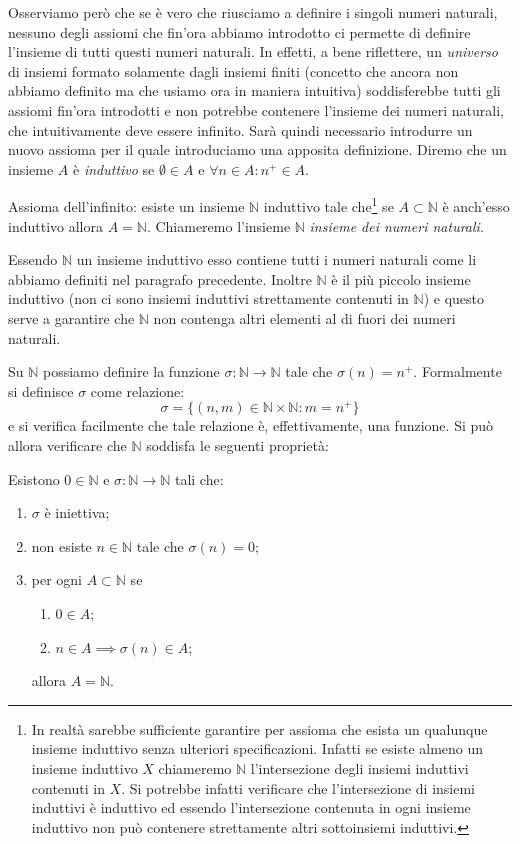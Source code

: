 \documentclass[italian,a4paper,hidelinks,headinclude]{scrartcl}
\newcommand{\NN}{{\mathbb N}}
\newcommand{\myemph}[1]{\emph{#1}\marginpar{#1}}
\begin{document}
Osserviamo però che se è vero che riusciamo a definire i singoli numeri naturali,
nessuno degli assiomi che fin'ora abbiamo introdotto ci permette di definire
l'insieme di tutti questi numeri naturali.
In effetti, a bene riflettere, un \emph{universo} di insiemi formato solamente
dagli insiemi finiti (concetto che ancora non abbiamo definito ma che usiamo ora
in maniera intuitiva) soddisferebbe tutti gli assiomi fin'ora introdotti e non
potrebbe contenere l'insieme dei numeri naturali, che intuitivamente deve essere
infinito.
Sarà quindi necessario introdurre un nuovo assioma per il quale
introduciamo una apposita definizione.
Diremo che un insieme $A$ è \emph{induttivo} se $\emptyset \in A$
e $\forall n\in A\colon n^+\in A$.

Assioma dell'infinito:
esiste un insieme $\NN$ \marginpar{$\NN$}
induttivo
tale che\footnote{%
In realtà sarebbe sufficiente garantire per assioma che esista un qualunque insieme induttivo
senza ulteriori specificazioni. Infatti se esiste almeno un insieme induttivo
$X$ chiameremo $\mathbb N$
l'intersezione degli insiemi induttivi contenuti in $X$. Si potrebbe infatti
verificare che l'intersezione di insiemi induttivi è induttivo ed essendo
l'intersezione contenuta in ogni insieme induttivo non può contenere strettamente
altri sottoinsiemi induttivi.
}
se $A\subset \NN$ è anch'esso induttivo allora $A=\NN$.
Chiameremo l'insieme $\NN$
\myemph{insieme dei numeri naturali}.

Essendo $\NN$ un insieme induttivo esso contiene tutti i numeri naturali come
li abbiamo definiti nel paragrafo precedente.
Inoltre $\NN$ è il più piccolo insieme induttivo
(non ci sono insiemi induttivi strettamente contenuti in $\NN$) e questo
serve a garantire che $\NN$ non contenga altri elementi al di fuori dei numeri
naturali.

Su $\NN$ possiamo definire la funzione $\sigma \colon \NN \to \NN$
tale che $\sigma(n) = n^+$. Formalmente si definisce $\sigma$ come relazione:
\[
  \sigma = \{(n,m) \in \NN \times \NN\colon m = n^+\}
\]
e si verifica facilmente che tale relazione è, effettivamente, una funzione.
Si può allora verificare che $\NN$ soddisfa le seguenti proprietà:
\begin{theorem}
Esistono $0\in \NN$
e $\sigma\colon \NN \to \NN$ tali che:
\begin{enumerate}
\item $\sigma$ è iniettiva;
\item non esiste $n\in \NN$ tale che $\sigma(n)=0$;
\item per ogni $A\subset \NN$ se
\begin{enumerate}
   \item $0\in A$;
   \item $n\in A \implies \sigma(n) \in A$;
\end{enumerate}
allora $A= \NN$.
\end{enumerate}
\end{theorem}
\end{document}
